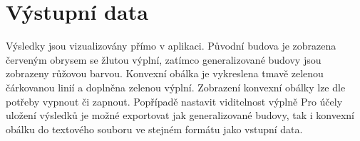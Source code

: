 \section{Výstupní data}
Výsledky jsou vizualizovány přímo v aplikaci. Původní budova je zobrazena červeným obrysem se žlutou výplní, zatímco generalizované budovy jsou zobrazeny růžovou barvou. Konvexní obálka je vykreslena tmavě zelenou čárkovanou linií a doplněna zelenou výplní. Zobrazení konvexní obálky lze dle potřeby vypnout či zapnout. Popřípadě nastavit viditelnost výplně
Pro účely uložení výsledků je možné exportovat jak generalizované budovy, tak i konvexní obálku do textového souboru ve stejném formátu jako vstupní data.